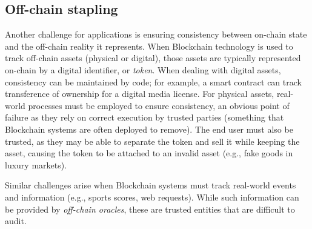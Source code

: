 \subsection{Off-chain stapling}
Another challenge for applications is ensuring consistency between on-chain state and the off-chain reality it represents.
When Blockchain technology is used to track off-chain assets (physical or digital), those assets are typically represented on-chain by a digital identifier, or \textit{token}.
When dealing with digital assets, consistency can be maintained by code; for example, a smart contract can track transference of ownership for a digital media license.
For physical assets, real-world processes must be employed to ensure consistency, an obvious point of failure as they rely on correct execution by trusted parties (something that Blockchain systems are often deployed to remove).
The end user must also be trusted, as they may be able to separate the token and sell it while keeping the asset, causing the token to be attached to an invalid asset (e.g., fake goods in luxury markets).

Similar challenges arise when Blockchain systems must track real-world events and information (e.g., sports scores, web requests).
While such information can be provided by \emph{off-chain oracles}, these are trusted entities that are difficult to audit.



